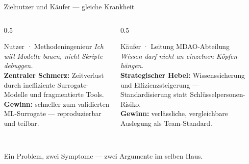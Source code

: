 \documentclass[aspectratio=169,11pt]{beamer}
\newcommand{\gq}[1]{\glqq #1\grqq{}}
\begin{document}
\begin{frame}[t]{Zielnutzer und Käufer — gleiche Krankheit}
  \begin{columns}[t]
    \begin{column}{0.5\textwidth}
      \begin{cardbox}[sfnavy]{Nutzer · Methodeningenieur}
        \footnotesize
        \textit{\gq{Ich will Modelle bauen, nicht Skripte debuggen.}}\\[3pt]
        \textbf{Zentraler Schmerz:} Zeitverlust durch ineffiziente
        Surrogate-Modelle und fragmentierte Tools.\\[3pt]
        \textbf{Gewinn:} schneller zum validierten ML-Surrogate — reproduzierbar und teilbar.
      \end{cardbox}
    \end{column}
    \begin{column}{0.5\textwidth}
      \begin{cardbox}[sfaccent]{Käufer · Leitung MDAO-Abteilung}
        \footnotesize
        \textit{\gq{Wissen darf nicht an einzelnen Köpfen hängen.}}\\[3pt]
        \textbf{Strategischer Hebel:} Wissenssicherung und Effizienzsteigerung —
        Standardisierung statt Schlüsselpersonen-Risiko.\\[3pt]
        \textbf{Gewinn:} verlässliche, vergleichbare Auslegung als Team-Standard.
      \end{cardbox}
    \end{column}
  \end{columns}
  \vspace{0.3em}
  \begin{center}
    \\[1pt]
    {\scriptsize\color{sfmute}Ein Problem, zwei Symptome — zwei Argumente im selben Haus.}
  \end{center}
\end{frame}
\end{document}
